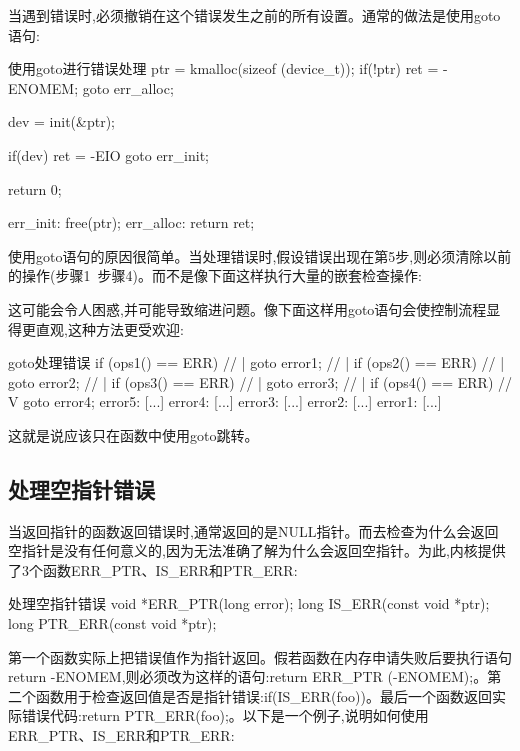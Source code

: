 \documentclass[lang=cn,newtx,10pt,scheme=chinese]{elegantbook}
\begin{document}
当遇到错误时,必须撤销在这个错误发生之前的所有设置。通常的做法是使用goto语句:

\begin{mycode}{使用goto进行错误处理}
ptr = kmalloc(sizeof (device_t));
if(!ptr) {
    ret = -ENOMEM;
    goto err_alloc;
}

dev = init(&ptr);

if(dev) {
    ret = -EIO
    goto err_init;
}

return 0;

err_init:
    free(ptr);
err_alloc:
    return ret;
\end{mycode}

使用goto语句的原因很简单。当处理错误时,假设错误出现在第5步,则必须清除以前的操作(步骤1~步骤4)。而不是像下面这样执行大量的嵌套检查操作:

\begin{mycode}{嵌套处理}
if (ops1() != ERR) {
    if (ops2() != ERR) {
        if ( ops3() != ERR) {
            if (ops4() != ERR) {
\end{mycode}

这可能会令人困惑,并可能导致缩进问题。像下面这样用goto语句会使控制流程显得更直观,这种方法更受欢迎:

\begin{mycode}{goto处理错误}
if (ops1() == ERR) // |
    goto error1;   // |
if (ops2() == ERR) // |
    goto error2;   // |
if (ops3() == ERR) // |
    goto error3;   // |
if (ops4() == ERR) // V
    goto error4;
error5:
[...]
error4:
[...]
error3:
[...]
error2:
[...]
error1:
[...]
\end{mycode}

这就是说应该只在函数中使用goto跳转。

\subsection{处理空指针错误}

当返回指针的函数返回错误时,通常返回的是NULL指针。而去检查为什么会返回空指针是没有任何意义的,因为无法准确了解为什么会返回空指针。为此,内核提供了3个函数ERR\_PTR、IS\_ERR和PTR\_ERR:

\begin{mycode}{处理空指针错误}
void *ERR_PTR(long error);
long IS_ERR(const void *ptr);
long PTR_ERR(const void *ptr);
\end{mycode}

第一个函数实际上把错误值作为指针返回。假若函数在内存申请失败后要执行语句return -ENOMEM,则必须改为这样的语句:return ERR\_PTR (-ENOMEM);。第二个函数用于检查返回值是否是指针错误:if(IS\_ERR(foo))。最后一个函数返回实际错误代码:return PTR\_ERR(foo);。以下是一个例子,说明如何使用ERR\_PTR、IS\_ERR和PTR\_ERR:
\end{document}
